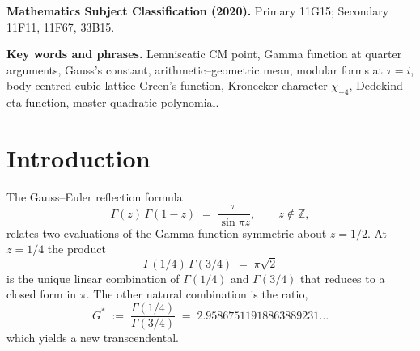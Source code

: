 \documentclass[11pt]{article}
\theoremstyle{definition}
\theoremstyle{remark}
\newcommand{\Gs}{G^{*}}
\newcommand{\GG}{G_{\!\scriptscriptstyle\mathrm{G}}}
\newcommand{\Z}{\mathbb{Z}}
\newcommand{\Q}{\mathbb{Q}}
\newcommand{\AGM}{\mathrm{AGM}}
\newcommand{\Aut}{\mathrm{Aut}}
\begin{document}
\begin{abstract}
Three structural results emerge: \textbf{(I)} the value algebra of
quasi-modular forms at $\tau = i$ is the polynomial ring
$\Q[\pi^{-1}, \GG^{4}]$ in two algebraically independent generators
under Chudnovsky's theorem, with $\pi^{-1}$ recording the quasi-modular
anomaly and $\GG^{4}$ recording the modular weight; \textbf{(II)} the
$m \mid k$ vanishing principle, stating that at a CM point with
$|\Aut(E)| = m$ a modular form $f$ of weight $k$ satisfies
$f(\tau_{\mathrm{CM}}) = 0$ unless $m \mid k$, holds in the only two
non-trivial cases over $\Q$ (lemniscatic with $m = 4$, equianharmonic
with $m = 6$); \textbf{(III)} the equianharmonic Gauss-analog $G_\rho$
admits the cubic-AGM expression $G_\rho = (2/\sqrt 3)/M_3(1, 2^{-1/3})$
at the cubic self-dual point $x^{3} = 1/2$, completing the structural
parallel with the lemniscatic $\GG = 1/\AGM(1, \sqrt 2)$ at the
self-complementary modulus $k = 1/\sqrt 2$. Every identity is traced
to its earliest source; the systematic dual-constant presentation
appears to be new.

A separate note in preparation by the same author draws consequences
of the $\chi_{-4}$-unification developed here for a discrete-substrate
physics framework; the present paper is independent of and does not
address that work.
\end{abstract}

\medskip
\noindent\textbf{Mathematics Subject Classification (2020).}
Primary 11G15;
Secondary 11F11, 11F67, 33B15.

\medskip
\noindent\textbf{Key words and phrases.}
Lemniscatic CM point, Gamma function at quarter arguments, Gauss's constant,
arithmetic--geometric mean, modular forms at $\tau = i$, body-centred-cubic
lattice Green's function, Kronecker character $\chi_{-4}$, Dedekind eta
function, master quadratic polynomial.

\tableofcontents

\section{Introduction}\label{sec:intro}

The Gauss--Euler reflection formula
\begin{equation}
\Gamma(z)\,\Gamma(1-z) \;=\; \frac{\pi}{\sin\pi z}, \qquad z\notin\Z, \label{eq:reflection}
\end{equation}
relates two evaluations of the Gamma function symmetric about $z = 1/2$. At
$z = 1/4$ the product
\begin{equation*}
\Gamma(1/4)\,\Gamma(3/4) \;=\; \pi\sqrt{2}
\end{equation*}
is the unique linear combination of $\Gamma(1/4)$ and $\Gamma(3/4)$ that
reduces to a closed form in $\pi$. The other natural combination is the ratio,
\begin{equation}
\boxed{\;\Gs \;:=\; \frac{\Gamma(1/4)}{\Gamma(3/4)} \;=\; 2.95867511918863889231\ldots\;} \label{eq:Gstardef}
\end{equation}
which yields a new transcendental.
\end{document}
